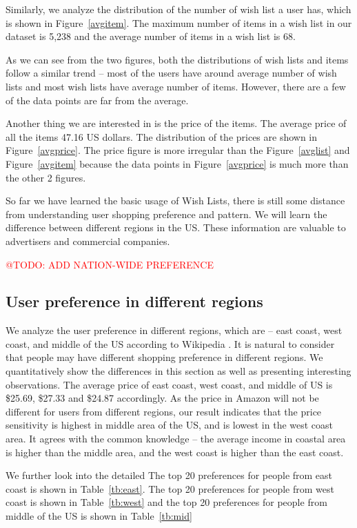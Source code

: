 \documentclass{llncs}
\makeatletter
\newcommand{\todo}[1]{\textcolor{red}{@TODO: #1}}
\makeatother
\begin{document}
Similarly, we analyze the distribution of the number of wish list a user has, which is shown in Figure~\ref{avgitem}. The maximum number of items in a wish list in our dataset is 5,238 and the average number of items in a wish list is 68. 

As we can see from the two figures, both the distributions of wish lists and items follow a similar trend -- most of the users have around average number of wish lists and most wish lists have average number of items. However, there are a few of the data points are far from the average. 

Another thing we are interested in is the price of the items. The average price of all the items 47.16 US dollars. The distribution of the prices are shown in Figure~\ref{avgprice}. The price figure is more irregular than the Figure~\ref{avglist} and Figure~\ref{avgitem} because the data points in Figure~\ref{avgprice} is much more than the other 2 figures.


So far we have learned the basic usage of Wish Lists, there is still some distance from understanding user shopping preference and pattern. We will learn the difference between different regions in the US. These information are valuable to advertisers and commercial companies. 

\todo{ADD NATION-WIDE PREFERENCE}
\subsection{User preference in different regions}
We analyze the user preference in different regions, which are -- east coast, west coast, and middle of the US according to Wikipedia \cite{east}\cite{west}. It is natural to consider that people may have different shopping preference in different regions. We quantitatively show the differences in this section as well as presenting interesting observations. The average price of east coast, west coast, and middle of US is \$25.69, \$27.33 and \$24.87 accordingly. As the price in Amazon will not be different for users from different regions, our result indicates that the price sensitivity is highest in middle area of the US, and is lowest in the west coast area. It agrees with the common knowledge -- the average income in coastal area is higher than the middle area, and the west coast is higher than the east coast. 

We further look into the detailed The top 20 preferences for people from east coast is shown in Table~\ref{tb:east}. The top 20 preferences for people from west coast is shown in Table~\ref{tb:west} and the top 20 preferences for people from middle of the US is shown in Table~\ref{tb:mid}
\end{document}
